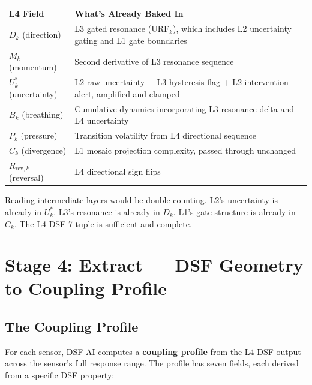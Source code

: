 \documentclass[11pt,a4paper]{article}
\begin{document}
\begin{center}
\begin{tabular}{@{}lp{9cm}@{}}
\toprule
\textbf{L4 Field} & \textbf{What's Already Baked In} \\
\midrule
$D_k$ (direction) & L3 gated resonance (URF$_k$), which includes L2 uncertainty gating and L1 gate boundaries \\
$M_k$ (momentum) & Second derivative of L3 resonance sequence \\
$U^*_k$ (uncertainty) & L2 raw uncertainty + L3 hysteresis flag + L2 intervention alert, amplified and clamped \\
$B_k$ (breathing) & Cumulative dynamics incorporating L3 resonance delta and L4 uncertainty \\
$P_k$ (pressure) & Transition volatility from L4 directional sequence \\
$C_k$ (divergence) & L1 mosaic projection complexity, passed through unchanged \\
$R_{\text{rev},k}$ (reversal) & L4 directional sign flips \\
\bottomrule
\end{tabular}
\end{center}

Reading intermediate layers would be double-counting. L2's
uncertainty is already in $U^*_k$. L3's resonance is already in
$D_k$. L1's gate structure is already in $C_k$. The L4 DSF
7-tuple is sufficient and complete.

\section{Stage 4: Extract --- DSF Geometry to Coupling Profile}

\subsection{The Coupling Profile}

For each sensor, DSF-AI computes a \textbf{coupling profile} from
the L4 DSF output across the sensor's full response range. The
profile has seven fields, each derived from a specific DSF property:
\end{document}

